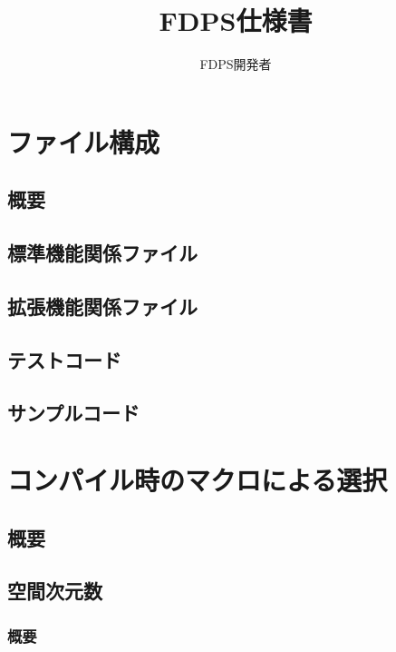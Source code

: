 \documentclass[12pt,a4paper]{jarticle}
\title{FDPS仕様書}
\author{FDPS開発者}
\date{}
\begin{document}
\maketitle
\tableofcontents

\newpage

\section{ファイル構成}

\subsection{概要}

\subsection{標準機能関係ファイル}

\subsection{拡張機能関係ファイル}

\subsection{テストコード}

\subsection{サンプルコード}

\newpage

\section{コンパイル時のマクロによる選択}

\subsection{概要}

\subsection{空間次元数}

\subsubsection{概要}
\end{document}
